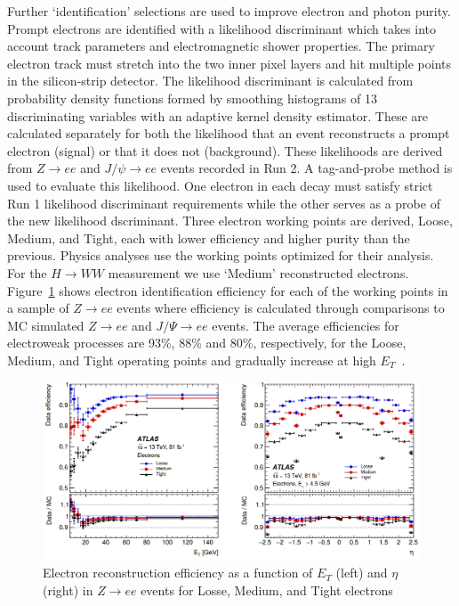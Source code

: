 Further `identification' selections are used to improve electron and photon purity. Prompt electrons are identified with a likelihood discriminant which takes into account track parameters and electromagnetic shower properties. The primary electron track must stretch into the two inner pixel layers and hit multiple points in the silicon-strip detector. The likelihood discriminant is calculated from probability density functions formed by smoothing histograms of 13 discriminating variables with an adaptive kernel density estimator.  These are calculated separately for both the likelihood that an event reconstructs a prompt electron (signal) or that it does not (background). These likelihoods are derived from $Z\rightarrow ee$ and $J/\psi\rightarrow ee$ events recorded in Run 2. A tag-and-probe method is used to evaluate this likelihood. One electron in each decay must satisfy strict Run 1 likelihood discriminant requirements while the other serves as a probe of the new likelihood dscriminant. Three electron working points are derived, Loose, Medium, and Tight, each with lower efficiency and higher purity than the previous. Physics analyses use the working points optimized for their analysis. For the $H\rightarrow WW$ measurement we use `Medium' reconstructed electrons. Figure~\ref{fig:ElectronEff} shows electron identification efficiency for each of the working points in a sample of $Z\rightarrow ee$ events where efficiency is calculated through comparisons to MC simulated $Z\rightarrow ee$ and $J/\Psi\rightarrow ee$ events. The average efficiencies for electroweak processes are 93\%, 88\% and 80\%, respectively, for the Loose, Medium, and Tight operating points and gradually increase at high $E_T$~\cite{ElectronPhotonPerformance}.

\begin{figure}[!h]
        \centering
    \includegraphics[width=.75\textwidth]{Pictures/ElectroEff.png}
    \caption{ Electron reconstruction efficiency as a function of $E_T$ (left) and $\eta$ (right) in $Z\rightarrow ee$ events for Losse, Medium, and Tight electrons~\cite{ElectronPhotonPerformance}}
    \label{fig:ElectronEff}
\end{figure}

